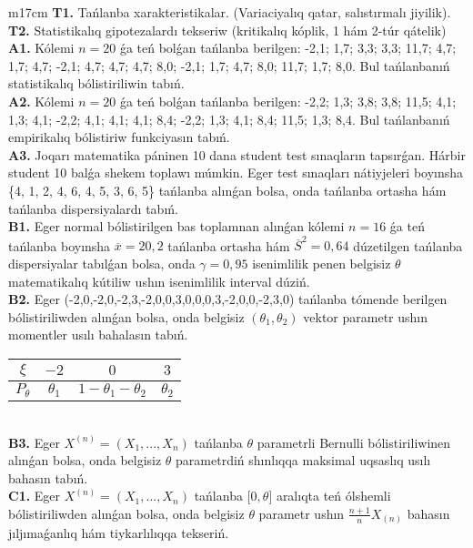 \documentclass{article}
\begin{document}
\begin{tabular}{m{17cm}}
\textbf{T1.} 
Tańlanba xarakteristikalar. (Variaciyalıq qatar, salıstırmalı jiyilik).
 \\
\textbf{T2.} 
Statistikalıq gipotezalardı tekseriw (kritikalıq kóplik, 1 hám 2-túr qátelik)
 \\
\textbf{A1.} 
Kólemi \(n = 20\) ǵa teń bolǵan tańlanba berilgen: -2,1; 1,7; 3,3; 3,3; 11,7; 4,7; 1,7; 4,7; -2,1; 4,7; 4,7; 4,7; 8,0; -2,1; 1,7; 4,7; 8,0; 11,7; 1,7; 8,0. Bul tańlanbanıń statistikalıq bólistiriliwin tabıń.
 \\
\textbf{A2.} 
Kólemi \(n = 20\) ǵa teń bolǵan tańlanba berilgen: -2,2; 1,3; 3,8; 3,8; 11,5; 4,1; 1,3; 4,1; -2,2; 4,1; 4,1; 4,1; 8,4; -2,2; 1,3; 4,1; 8,4; 11,5; 1,3; 8,4. Bul tańlanbanıń empirikalıq bólistiriw funkciyasın tabıń.
 \\
\textbf{A3.} 
Joqarı matematika páninen 10 dana student test sınaqların tapsırǵan. Hárbir student 10 balǵa shekem toplawı múmkin. Eger test sınaqları nátiyjeleri boyınsha \{4, 1, 2, 4, 6, 4, 5, 3, 6, 5\} tańlanba alınǵan bolsa, onda tańlanba ortasha hám tańlanba dispersiyalardı tabıń.
 \\
\textbf{B1.} 
Eger normal bólistirilgen bas toplamnan alınǵan kólemi \(n = 16\) ǵa teń tańlanba boyınsha \(\overline{x} = 20,2\) tańlanba ortasha hám \({\overline{S}}^{2} = 0,64\) dúzetilgen tańlanba dispersiyalar tabılǵan bolsa, onda \(\gamma = 0,95\) isenimlilik penen belgisiz \(\theta\) matematikalıq kútiliw ushın isenimlilik interval dúziń.
 \\
\textbf{B2.} 
Eger (-2,0,-2,0,-2,3,-2,0,0,3,0,0,0,3,-2,0,0,-2,3,0) tańlanba tómende berilgen bólistiriliwden alınǵan bolsa, onda belgisiz \(\left( \theta_{1},\theta_{2} \right)\) vektor parametr ushın momentler usılı bahalasın tabıń.
\begin{tabular}{|c|c|c|c|}
  \hline
$\xi$ &
$- 2$ &
$0$ &
$3$\\
\hline
\(P_{\theta}\) & \(\theta_{1}\) & \(1 - \theta_{1} - \theta_{2}\) & \(\theta_{2}\) \\
\hline
\end{tabular}
 \\
\textbf{B3.} 
Eger \(X^{(n)} = \left( X_{1},...,X_{n} \right)\) tańlanba \(\theta\) parametrli Bernulli bólistiriliwinen alınǵan bolsa, onda belgisiz \(\theta\) parametrdiń shınlıqqa maksimal uqsaslıq usılı bahasın tabıń.
 \\
\textbf{C1.} 
Eger \(X^{(n)} = \left( X_{1},...,X_{n} \right)\) tańlanba \(\lbrack 0,\theta\rbrack\) aralıqta teń ólshemli bólistiriliwden alınǵan bolsa, onda belgisiz \(\theta\) parametr ushın \(\frac{n + 1}{n}X_{(n)}\) bahasın jıljımaǵanlıq hám tiykarlılıqqa tekseriń.

\end{tabular}
\end{document}
